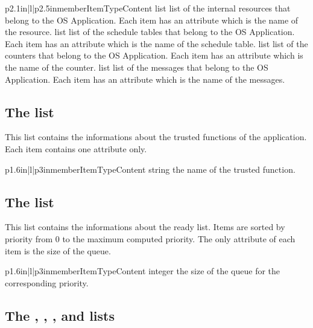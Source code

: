 \begin{longtableiii}{p{2.1in}|l|p{2.5in}}{member}{Item}{Type}{Content}
  {list}
  {list of the internal resources that belong to the OS Application. Each item has an attribute  which is the name of the resource.}
  {list}
  {list of the schedule tables that belong to the OS Application. Each item has an attribute  which is the name of the schedule table.}
  {list}
  {list of the counters that belong to the OS Application. Each item has an attribute  which is the name of the counter.}
  {list}
  {list of the messages that belong to the OS Application. Each item has an attribute  which is the name of the messages.}
\end{longtableiii}

\subsection{The  list}

This list contains the informations about the trusted functions of the application. Each item contains one attribute only.

\begin{longtableiii}{p{1.6in}|l|p{3in}}{member}{Item}{Type}{Content}
  {string}
  {the name of the trusted function.}
\end{longtableiii}

\subsection{The  list}

This list contains the informations about the ready list. Items are sorted by priority from 0 to the maximum computed priority. The only attribute of each item is the size of the queue.

\begin{longtableiii}{p{1.6in}|l|p{3in}}{member}{Item}{Type}{Content}
  {integer}
  {the size of the queue for the corresponding priority.}
\end{longtableiii}

\subsection{The , , ,  and  lists}

